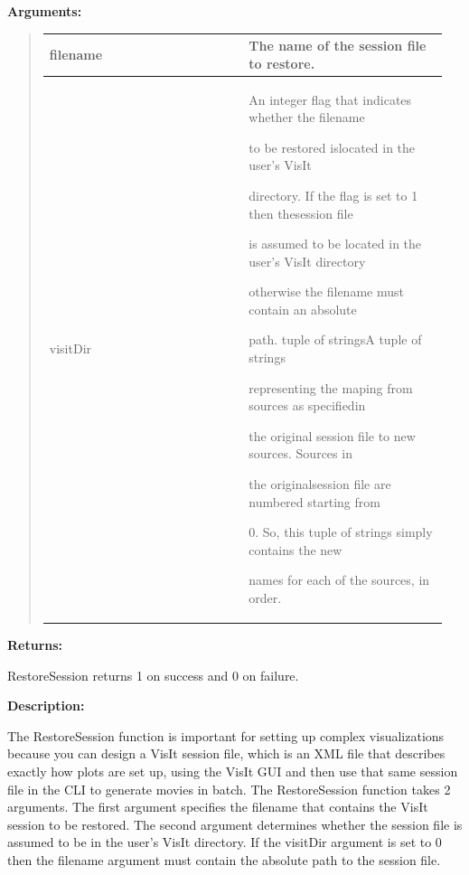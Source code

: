 \documentclass[letterpaper,10pt,english]{sphinxmanual}
\begin{document}
\begin{DUlineblock}{0em}
\item[] 
\item[] \textbf{Arguments:}
\end{DUlineblock}
\begin{quote}

\begin{tabular}{|p{0.475\linewidth}|p{0.475\linewidth}|}
\hline

filename
 & 
The name of the session file to restore.
\\
\hline
visitDir
 & 
\begin{DUlineblock}{0em}
\item[] An integer flag that indicates whether the filename
\item[] to be restored islocated in the user's VisIt
\item[] directory. If the flag is set to 1 then thesession file
\item[] is assumed to be located in the user's VisIt directory
\item[] otherwise the filename must contain an absolute
\item[] path. tuple of stringsA tuple of strings
\item[] representing the maping from sources as specifiedin
\item[] the original session file to new sources. Sources in
\item[] the originalsession file are numbered starting from
\item[] 0. So, this tuple of strings simply contains the new
\item[] names for each of the sources, in order.
\end{DUlineblock}
\\
\hline\end{tabular}

\end{quote}

\begin{DUlineblock}{0em}
\item[] 
\item[] \textbf{Returns:}
\item[] RestoreSession returns 1 on success and 0 on failure.
\item[] 
\item[] \textbf{Description:}
\item[] The RestoreSession function is important for setting up complex
visualizations because you can design a VisIt session file, which is an XML
file that describes exactly how plots are set up, using the VisIt GUI and
then use that same session file in the CLI to generate movies in batch. The
RestoreSession function takes 2 arguments. The first argument specifies the
filename that contains the VisIt session to be restored. The second
argument determines whether the session file is assumed to be in the user's
VisIt directory. If the visitDir argument is set to 0 then the filename
argument must contain the absolute path to the session file.
\end{DUlineblock}
\end{document}
